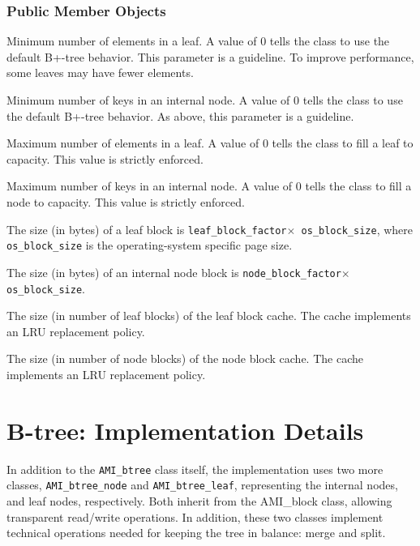 \etabb

\subsection{Public Member Objects}

\btabb

   {Minimum number of elements in a leaf. A
  value of $0$ tells the class to use the default B+-tree behavior. This
  parameter is a guideline. To improve performance, some leaves may have
  fewer elements.}

   {Minimum number of keys in an internal
  node. A value of $0$ tells the class to use the default B+-tree
  behavior. As above, this parameter is a guideline.}

   {Maximum number of elements in a leaf. A
  value of $0$ tells the class to fill a leaf to capacity. This value is
  strictly enforced.}

   {Maximum number of keys in an internal
  node. A value of $0$ tells the class to fill a node to capacity. This
  value is strictly enforced.}

   {The size (in bytes) of a leaf block
  is {\tt leaf\_block\_factor$\times$ os\_block\_size}, where {\tt
  os\_block\_size} is the operating-system specific page size.}

   {The size (in bytes) of an internal
  node block is {\tt node\_block\_factor$\times$ os\_block\_size}.}

   {The size (in number of leaf blocks) of
  the leaf block cache. The cache implements an LRU replacement policy.}

   {The size (in number of node blocks) of
  the node block cache. The cache implements an LRU replacement policy.}

\etabb
{}

\chapter{B-tree: Implementation Details}
In addition to the {\tt AMI\_btree} class itself, the implementation uses two
more classes, {\tt AMI\_btree\_node} and {\tt AMI\_btree\_leaf}, representing
the internal nodes, and leaf nodes, respectively. Both inherit from
the AMI\_block class, allowing transparent read/write operations. In
addition, these two classes implement technical operations needed for
keeping the tree in balance: merge and split. 

